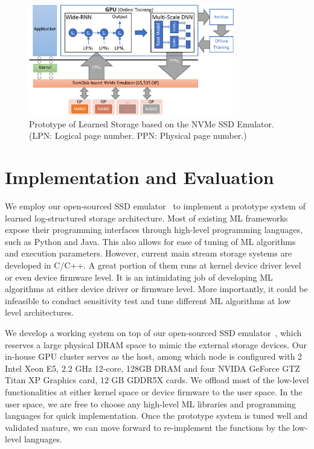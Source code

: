 \begin{figure}[t]
\centering
\includegraphics[width=0.8\textwidth]{fig/emulator.eps}
\caption{Prototype of Learned Storage based on the NVMe SSD Emulator. (LPN: Logical page number. PPN: Physical page number.)}
\label{fig:emulator_architecture}

\end{figure}\section{Implementation and Evaluation}

We employ our open-sourced SSD emulator~\cite{zhou2018cpftl} to implement
a prototype system of learned log-structured storage architecture.
Most of existing ML frameworks expose their programming interfaces through
high-level programming languages, such as Python and Java.
This also allows for ease of tuning of ML algorithms and execution parameters.
However, current main stream storage systems are developed in C/C++.
A great portion of them runs at kernel device driver level or even device firmware level.
It is an intimidating job of developing ML algorithms at either device driver or firmware level.
More importantly, it could be infeasible to conduct sensitivity
test and tune different ML algorithms at low level architectures.

We develop a working system on top of our open-sourced SSD emulator~\cite{zhou2018cpftl},
which reserves a large physical DRAM space to mimic the external storage devices.
Our in-house GPU cluster serves as the host, among which node is configured with 2 Intel Xeon E5,
2.2 GHz 12-core, 128GB DRAM and four NVIDA GeForce GTZ Titan XP Graphics card, 12 GB GDDR5X cards. 
We offload most of the low-level functionalities
at either kernel space or device firmware to the user space.
In the user space, we are free to choose any high-level ML libraries
and programming languages for quick implementation.
Once the prototype system is tuned well and validated mature,
we can move forward to re-implement the functions by the low-level languages.

